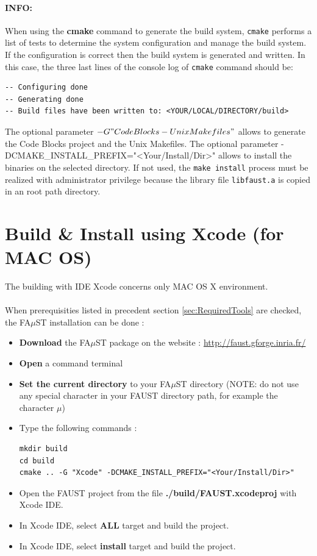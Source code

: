 \paragraph{INFO:}When using the \textbf{cmake} command to generate the build system, \texttt{cmake} performs a list of tests to determine the system configuration and manage the build system. If the configuration is correct then the build system is generated and written. In this case, the three last lines of the console log of \texttt{cmake} command should be:
\begin{lstlisting}
-- Configuring done 
-- Generating done 
-- Build files have been written to: <YOUR/LOCAL/DIRECTORY/build>
\end{lstlisting}
The optional parameter \texttt{$-G "CodeBlocks - Unix Makefiles"$} allows to generate the Code Blocks project and the Unix Makefiles. The optional parameter -DCMAKE\_INSTALL\_PREFIX="<Your/Install/Dir>" allows to install the binaries on the selected directory. If not used, the \texttt{make install} process must be realized with administrator privilege because the library file \texttt{libfaust.a} is copied in an root path directory. 


\section{Build \& Install using Xcode (for MAC OS)}\label{sec:MacInstallXcode}

The building with IDE Xcode concerns only MAC OS X environment.
\paragraph{}When prerequisities listed in precedent section \ref{sec:RequiredTools} are checked, the FA$\mu$ST installation can be done : 
\begin{itemize}
\item \textbf{Download} the FA$\mu$ST package on the website :  \url{http://faust.gforge.inria.fr/}
\item \textbf{Open} a command terminal
\item \textbf{Set the current directory} to your FA$\mu$ST directory (NOTE: do not use any special character in your FAUST directory path, for example the character $\mu$)
\item Type the following commands : 
\begin{lstlisting}
mkdir build
cd build
cmake .. -G "Xcode" -DCMAKE_INSTALL_PREFIX="<Your/Install/Dir>"
\end{lstlisting}

\item Open the FAUST project from the file \textbf{./build/FAUST.xcodeproj} with Xcode IDE. 
\item In Xcode IDE, select \textbf{ALL} target and build the project. 
\item In Xcode IDE, select \textbf{install} target and build the project. 
\end{itemize}

